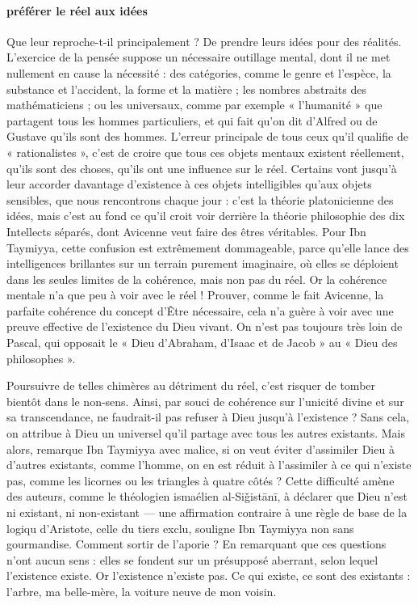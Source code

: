 \paragraph{préférer le réel aux idées}Que leur reproche-t-il principalement ? De prendre leurs idées pour des
réalités. L'exercice de la pensée suppose un nécessaire outillage
mental, dont il ne met nullement en cause la nécessité : des catégories,
comme le genre et l'espèce, la substance et l'accident, la forme et la
matière ; les nombres abstraits des mathématiciens ; ou les universaux,
comme par exemple « l'humanité » que partagent tous les hommes
particuliers, et qui fait qu'on dit d'Alfred ou de Gustave qu'ils sont
des hommes. L'erreur principale de tous ceux qu'il qualifie de «
rationalistes », c'est de croire que tous ces objets mentaux existent
réellement, qu'ils sont des choses, qu'ils ont une influence sur le
réel. Certains vont jusqu'à leur accorder davantage d'existence à ces
objets intelligibles qu'aux objets sensibles, que nous rencontrons
chaque jour : c'est la théorie platonicienne des idées, mais c'est au
fond ce qu'il croit voir derrière la théorie philosophie des dix
Intellects séparés, dont Avicenne veut faire des êtres véritables. Pour
Ibn Taymiyya, cette confusion est extrêmement dommageable, parce qu'elle
lance des intelligences brillantes sur un terrain purement imaginaire,
où elles se déploient dans les seules limites de la cohérence, mais non
pas du réel. Or la cohérence mentale n'a que peu à voir avec le réel !
Prouver, comme le fait Avicenne, la parfaite cohérence du concept d'Être
nécessaire, cela n'a guère à voir avec une preuve effective de
l'existence du Dieu vivant. On n'est pas toujours très loin de Pascal,
qui opposait le « Dieu d'Abraham, d'Isaac et de Jacob » au « Dieu des
philosophes ».

Poursuivre de telles chimères au détriment du réel, c'est risquer de
tomber bientôt dans le non-sens. Ainsi, par souci de cohérence sur
l'unicité divine et sur sa transcendance, ne faudrait-il pas refuser à
Dieu jusqu'à l'existence ? Sans cela, on attribue à Dieu un universel
qu'il partage avec tous les autres existants. Mais alors, remarque Ibn
Taymiyya avec malice, si on veut éviter d'assimiler Dieu à d'autres
existants, comme l'homme, on en est réduit à l'assimiler à ce qui
n'existe pas, comme les licornes ou les triangles à quatre côtés ? Cette
difficulté amène des auteurs, comme le théologien ismaélien
al-Siǧistānī, à déclarer que Dieu n'est ni existant, ni non-existant ---
une affirmation contraire à une règle de base de la logiqu
d'Aristote, celle du tiers exclu, souligne Ibn Taymiyya non sans
gourmandise. Comment sortir de l'aporie ? En remarquant que ces
questions n'ont aucun sens : elles se fondent sur un présupposé
aberrant, selon lequel l'existence existe. Or l'existence n'existe pas.
Ce qui existe, ce sont des existants : l'arbre, ma belle-mère, la
voiture neuve de mon voisin.

